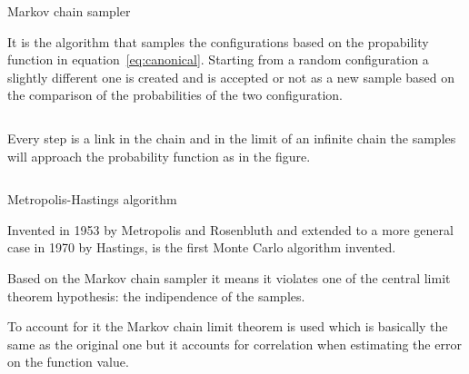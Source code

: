 \documentclass{beamer}
\begin{document}
\begin{frame}{Markov chain sampler}

It is the algorithm that samples the configurations based on the propability
function in equation~\ref{eq:canonical}. Starting from a random configuration
a slightly different one is created and is accepted or not as a new sample
based on the comparison of the probabilities of the two configuration.

\vspace{3mm}

\begin{columns}


Every step is a link in the chain and in the limit of an infinite chain the
samples will approach the probability function as in the figure.

\end{columns}
\end{frame}


\begin{frame}{Metropolis-Hastings algorithm}

Invented in 1953 by Metropolis and Rosenbluth and extended to a more general case
in 1970 by Hastings, is the first Monte Carlo algorithm invented. 

\vspace{3mm}

Based on the Markov chain sampler it means it violates one of the central limit
theorem hypothesis: the indipendence of the samples.

\vspace{3mm}

To account for it the Markov chain limit theorem is used which is basically the
same as the original one but it accounts for correlation when estimating the
error on the function value. 

\end{frame}
\end{document}
